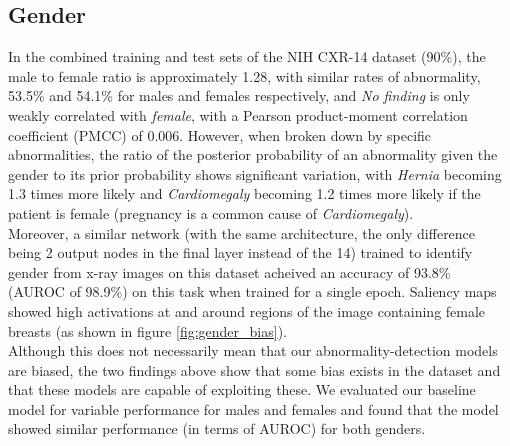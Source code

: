 \documentclass[12pt,oneside,a4paper]{report}
\begin{document}
\subsection{Gender}
In the combined training and test sets of the NIH CXR-14 dataset (90\%), the male to female ratio is approximately 1.28, with similar rates of abnormality, 53.5\% and 54.1\% for males and females respectively, and \emph{No finding} is only weakly correlated with \emph{female}, with a Pearson product-moment correlation coefficient (PMCC) of 0.006.
However, when broken down by specific abnormalities, the ratio of the posterior probability of an abnormality given the gender to its prior probability shows significant variation, with \emph{Hernia} becoming 1.3 times more likely and \emph{Cardiomegaly} becoming 1.2 times more likely if the patient is female (pregnancy is a common cause of \emph{Cardiomegaly}).\\

Moreover, a similar network (with the same architecture, the only difference being 2 output nodes in the final layer instead of the 14) trained to identify gender from x-ray images on this dataset acheived an accuracy of 93.8\% (AUROC of 98.9\%) on this task when trained for a single epoch. Saliency maps showed high activations at and around regions of the image containing female breasts (as shown in figure \ref{fig:gender_bias}).\\

Although this does not necessarily mean that our abnormality-detection models are biased, the two findings above show that some bias exists in the dataset and that these models are capable of exploiting these. We evaluated our baseline model for variable performance for males and females and found that the model showed similar performance (in terms of AUROC) for both genders.
\end{document}
